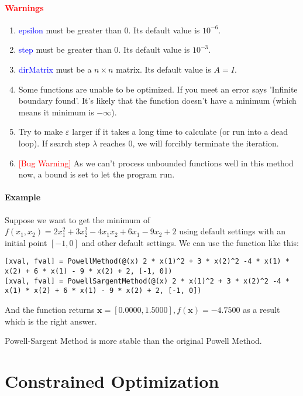 \documentclass{article}
\begin{document}
\paragraph{\textcolor{red}{Warnings}}
\begin{enumerate}
    \item \textcolor{blue}{epsilon} must be greater than $0$. Its default value is $10^{-6}$.
    \item \textcolor{blue}{step} must be greater than $0$. Its default value is $10^{-3}$.
    \item \textcolor{blue}{dirMatrix} must be a $n \times n$ matrix. Its default value is $A = I$.
    \item Some functions are unable to be optimized. If you meet an error says 'Infinite boundary found'. It's likely that the function doesn't have a minimum (which means it minimum is $-\infty$).
    \item Try to make $\varepsilon$ larger if it takes a long time to calculate (or run into a dead loop). If search step $\lambda$ reaches $0$, we will forcibly terminate the iteration.
    \item \textcolor{red}{[Bug Warning]} As we can't process unbounded functions well in this method now, a bound is set to let the program run.  
\end{enumerate}

\paragraph{Example}
Suppose we want to get the minimum of $f(x_1, x_2) = 2 x_1^2 + 3 x_2^2 - 4 x_1 x_2 + 6 x_1 - 9 x_2 + 2$ using default settings with an initial point $[-1, 0]$ and other default settings. We can use the function like this:
\begin{verbatim}
[xval, fval] = PowellMethod(@(x) 2 * x(1)^2 + 3 * x(2)^2 -4 * x(1) * x(2) + 6 * x(1) - 9 * x(2) + 2, [-1, 0])
[xval, fval] = PowellSargentMethod(@(x) 2 * x(1)^2 + 3 * x(2)^2 -4 * x(1) * x(2) + 6 * x(1) - 9 * x(2) + 2, [-1, 0])
\end{verbatim}

And the function returns $\mathbf{x} = [0.0000, 1.5000], f(\mathbf{x}) = -4.7500$ as a result which is the right answer.

Powell-Sargent Method is more stable than the original Powell Method.

\section{Constrained Optimization}
\end{document}
